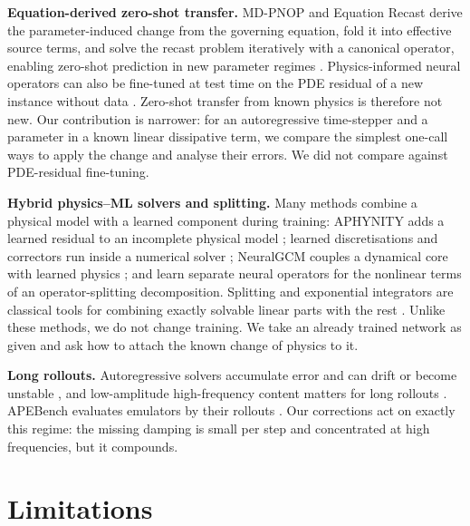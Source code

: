 \documentclass{article}
\theoremstyle{plain}
\begin{document}
\textbf{Equation-derived zero-shot transfer.}
MD-PNOP and Equation Recast derive the parameter-induced change from the governing equation, fold it into effective source terms, and solve the recast problem iteratively with a canonical operator, enabling zero-shot prediction in new parameter regimes \citep{cheng2026mdpnop,cheng2026recast}.
Physics-informed neural operators can also be fine-tuned at test time on the PDE residual of a new instance without data \citep{li2024pino}.
Zero-shot transfer from known physics is therefore not new.
Our contribution is narrower: for an autoregressive time-stepper and a parameter in a known linear dissipative term, we compare the simplest one-call ways to apply the change and analyse their errors. We did not compare against PDE-residual fine-tuning.

\textbf{Hybrid physics--ML solvers and splitting.}
Many methods combine a physical model with a learned component during training: APHYNITY adds a learned residual to an incomplete physical model \citep{yin2021aphynity}; learned discretisations and correctors run inside a numerical solver \citep{barsinai2019datadriven,um2020solverintheloop,kochkov2021mlcfd}; NeuralGCM couples a dynamical core with learned physics \citep{kochkov2024neuralgcm}; and \citet{gopakumar2026physical} learn separate neural operators for the nonlinear terms of an operator-splitting decomposition.
Splitting and exponential integrators are classical tools for combining exactly solvable linear parts with the rest \citep{strang1968construction,mclachlan2002splitting,hochbruck2010exponential}.
Unlike these methods, we do not change training. We take an already trained network as given and ask how to attach the known change of physics to it.

\textbf{Long rollouts.}
Autoregressive solvers accumulate error and can drift or become unstable \citep{brandstetter2022mpnn,mccabe2023stability,stachenfeld2022learned}, and low-amplitude high-frequency content matters for long rollouts \citep{lippe2023pderefiner}.
APEBench evaluates emulators by their rollouts \citep{koehler2024apebench}.
Our corrections act on exactly this regime: the missing damping is small per step and concentrated at high frequencies, but it compounds.

\section{Limitations}
\label{sec:limitations}
\end{document}
